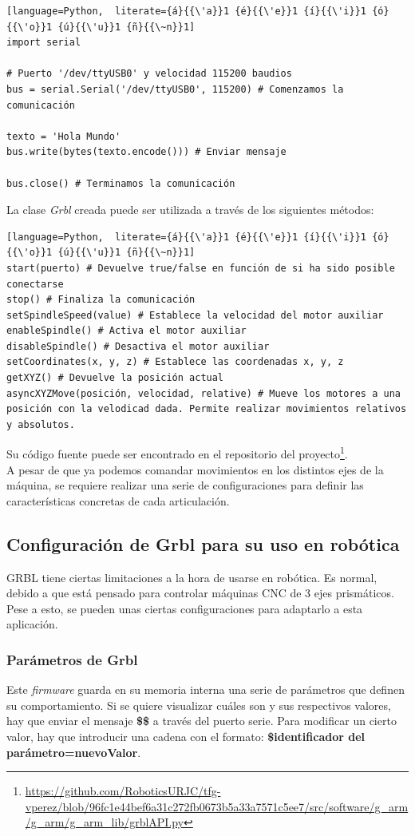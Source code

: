 \begin{lstlisting}[language=Python,  literate={á}{{\'a}}1 {é}{{\'e}}1 {í}{{\'i}}1 {ó}{{\'o}}1 {ú}{{\'u}}1 {ñ}{{\~n}}1]
import serial

# Puerto '/dev/ttyUSB0' y velocidad 115200 baudios
bus = serial.Serial('/dev/ttyUSB0', 115200) # Comenzamos la comunicación 

texto = 'Hola Mundo'
bus.write(bytes(texto.encode())) # Enviar mensaje

bus.close() # Terminamos la comunicación
\end{lstlisting}


\noindent La clase \textit{Grbl} creada puede ser utilizada a través de los siguientes métodos:

\begin{lstlisting}[language=Python,  literate={á}{{\'a}}1 {é}{{\'e}}1 {í}{{\'i}}1 {ó}{{\'o}}1 {ú}{{\'u}}1 {ñ}{{\~n}}1]
start(puerto) # Devuelve true/false en función de si ha sido posible conectarse
stop() # Finaliza la comunicación
setSpindleSpeed(value) # Establece la velocidad del motor auxiliar
enableSpindle() # Activa el motor auxiliar
disableSpindle() # Desactiva el motor auxiliar
setCoordinates(x, y, z) # Establece las coordenadas x, y, z 
getXYZ() # Devuelve la posición actual
asyncXYZMove(posición, velocidad, relative) # Mueve los motores a una posición con la velodicad dada. Permite realizar movimientos relativos y absolutos.
\end{lstlisting}

Su código fuente puede ser encontrado en el repositorio del 
proyecto\footnote{\url{https://github.com/RoboticsURJC/tfg-vperez/blob/96fc1e44bef6a31c272fb0673b5a33a7571c5ee7/src/software/g_arm/g_arm/g_arm_lib/grblAPI.py}}.
\\

A pesar de que ya podemos comandar movimientos en los distintos ejes de la máquina, se requiere realizar una serie 
de configuraciones para definir las características concretas de cada articulación.
\newpage
\subsection{Configuración de Grbl para su uso en robótica}
\noindent GRBL tiene ciertas limitaciones a la hora de usarse en robótica. Es normal, debido a que está pensado para controlar máquinas 
\acs{CNC} de 3 ejes prismáticos. Pese a esto, se pueden unas ciertas configuraciones para adaptarlo a esta aplicación. 

\subsubsection{Parámetros de Grbl}
Este \textit{firmware} guarda en su memoria interna una serie de parámetros que definen su 
comportamiento. Si se quiere visualizar cuáles son y sus respectivos valores, hay que enviar 
el mensaje \textbf{\$\$} a través del puerto serie. Para modificar un cierto valor, hay que introducir una cadena 
con el formato: \textbf{\$identificador del parámetro=nuevoValor}.

